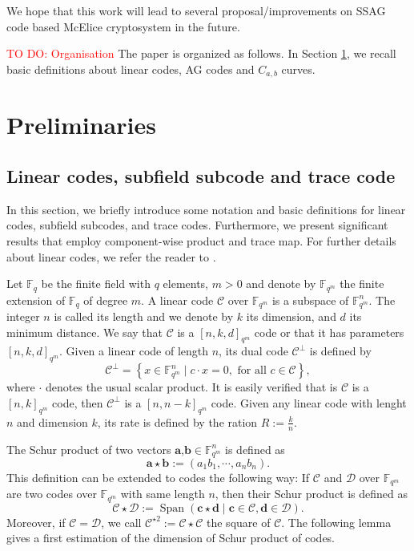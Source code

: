 \documentclass[a4paper]{article}
\theoremstyle{definition}
\theoremstyle{remark}
\newcommand{\calC}{\mathcal{C}}
\newcommand{\calD}{\mathcal{D}}
\newcommand{\fqm}{\mathbb{F}_{q^m}}
\newcommand{\fq}{\mathbb{F}_{q}}
\newcommand{\Span}[1]{\operatorname{Span}\left(#1\right)}
\newcommand\TODO[1]{\textcolor{red}{TO DO: #1}}
\begin{document}
We hope that this work will lead to several proposal/improvements on SSAG code based McElice cryptosystem in the future.

\TODO{Organisation}
The paper is organized as follows. In Section \ref{sec:preli}, we recall basic definitions about linear codes, AG codes and $C_{a,b}$ curves.


\section{Preliminaries}\label{sec:preli}

\subsection{Linear codes, subfield subcode and trace code}


In this section, we briefly introduce some notation and basic definitions for linear codes, subfield subcodes, and trace codes. Furthermore, we present significant results that employ component-wise product and trace map. For further details about linear codes, we refer the reader to \cite{MS86}.

\noindent Let $\fq$ be the finite field with $q$ elements, $m > 0$ and denote  by $\fqm$ the finite extension of $\fq$ of degree $m$. A linear code $\calC$ over $\fqm$ is a subspace of $\fqm^n$. The integer $n$ is called its length and we denote by $k$ its dimension, and $d$ its minimum distance. We say that $\calC$ is a $[n,k,d]_{q^m}$ code or that it has parameters $[n,k,d]_{q^m}$. Given a linear code of length $n$, its dual code $\calC^{\perp}$ is defined by 
\[\calC^{\perp}=\left\lbrace x \in \fqm^n \mid c \cdot x=0, \text{ for all } c \in \calC \right\rbrace,\]  
where $\cdot$ denotes the usual scalar product. It is easily verified that is $\calC$ is a $[n,k]_{q^m}$ code, then $\calC^{\perp}$ is a $[n,n-k]_{q^m}$ code.
Given any linear code with lenght $n$ and dimension $k$, its rate is defined by the ration $R := \frac{k}{n}$.

\noindent The Schur product of two vectors $\mathbf{a}$,$\mathbf{b} \in \fqm^n$ is defined as 
\[ \mathbf{a} \star \mathbf{b} := (a_1b_1,\cdots,a_nb_n). \]
This definition can be extended to codes the following way: If $\calC$ and $\calD$ over $\fqm$ are two codes over $\fqm$ with same length $n$, then their Schur product is defined as
\[ \calC \star \calD := \Span{\mathbf{c} \star \mathbf{d} \mid \mathbf{c} \in \calC, \mathbf{d} \in \calD}. \]
Moreover, if $\calC = \calD$, we call $\calC^{\star 2} := \calC \star \calC$ the square of $\calC$. The following lemma gives a first estimation of the dimension of Schur product of codes.
\end{document}
